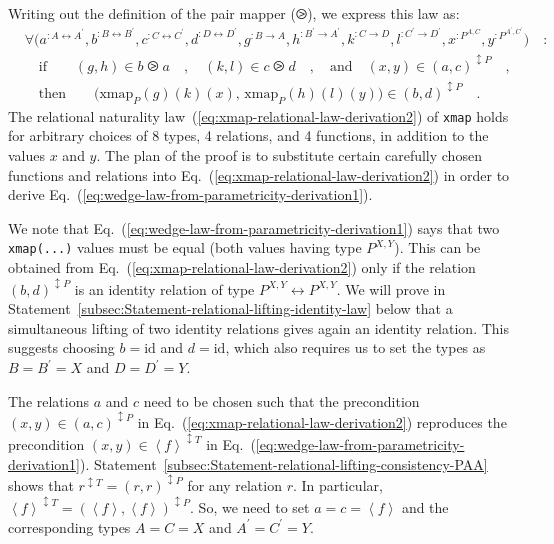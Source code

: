 Writing out the definition of the pair mapper ($\ogreaterthan$),
we express this law as:
\begin{align}
 & \forall\big(a^{:A\leftrightarrow A^{\prime}},b^{:B\leftrightarrow B^{\prime}},c^{:C\leftrightarrow C^{\prime}},d^{:D\leftrightarrow D^{\prime}},g^{:B\rightarrow A},h^{:B^{\prime}\rightarrow A^{\prime}},k^{:C\rightarrow D},l^{:C^{\prime}\rightarrow D^{\prime}},x^{:P^{A,C}},y^{:P^{A^{\prime},C^{\prime}}}\big)\quad:\nonumber \\
 & \quad\text{if}\quad\quad(g,h)\in b\ogreaterthan a\quad,\quad(k,l)\in c\ogreaterthan d\quad,\quad\text{and}\quad(x,y)\in(a,c)^{\updownarrow P}\quad,\nonumber \\
 & \quad\text{then}\quad\quad\big(\text{xmap}_{P}(g)(k)(x),\,\text{xmap}_{P}(h)(l)(y)\big)\in(b,d)^{\updownarrow P}\quad.\label{eq:xmap-relational-law-derivation2}
\end{align}
The relational naturality law~(\ref{eq:xmap-relational-law-derivation2})
of \lstinline!xmap! holds for arbitrary choices of 8 types, 4 relations,
and 4 functions, in addition to the values $x$ and $y$. The plan
of the proof is to substitute certain carefully chosen functions and
relations into Eq.~(\ref{eq:xmap-relational-law-derivation2}) in
order to derive Eq.~(\ref{eq:wedge-law-from-parametricity-derivation1}). 

We note that Eq.~(\ref{eq:wedge-law-from-parametricity-derivation1})
says that two \lstinline!xmap(...)! values must be equal (both values
having type $P^{X,Y}$). This can be obtained from Eq.~(\ref{eq:xmap-relational-law-derivation2})
only if the relation $(b,d)^{\updownarrow P}$ is an identity relation
of type $P^{X,Y}\leftrightarrow P^{X,Y}$. We will prove in Statement~\ref{subsec:Statement-relational-lifting-identity-law}
below that a simultaneous lifting of two identity relations gives
again an identity relation. This suggests choosing $b=\text{id}$
and $d=\text{id}$, which also requires us to set the types as $B=B^{\prime}=X$
and $D=D^{\prime}=Y$.

The relations $a$ and $c$ need to be chosen such that the precondition
$(x,y)\in(a,c)^{\updownarrow P}$ in Eq.~(\ref{eq:xmap-relational-law-derivation2})
reproduces the precondition $(x,y)\in\left<f\right>^{\updownarrow T}$
in Eq.~(\ref{eq:wedge-law-from-parametricity-derivation1}). Statement~\ref{subsec:Statement-relational-lifting-consistency-PAA}
shows that $r^{\updownarrow T}=(r,r)^{\updownarrow P}$ for any relation
$r$. In particular, $\left<f\right>^{\updownarrow T}=(\left<f\right>,\left<f\right>)^{\updownarrow P}$.
So, we need to set $a=c=\left<f\right>$ and the corresponding types
$A=C=X$ and $A^{\prime}=C^{\prime}=Y$.

